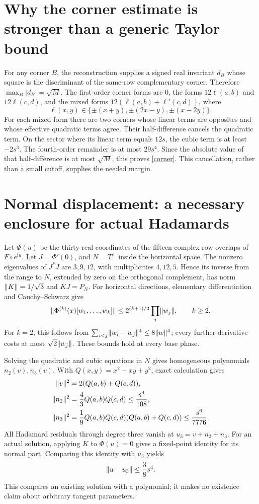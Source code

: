 \documentclass[11pt]{article}
\newcommand{\ii}{\mathrm i}\newcommand{\perm}{\operatorname{perm}}
\begin{document}
\section*{Why the corner estimate is stronger than a generic Taylor bound}
For any corner $B$, the reconstruction supplies a signed real invariant
$d_B$ whose square is the discriminant of the same-row complementary
corner. Therefore $\max_B|d_B|=\sqrt M$.
The first-order corner forms are $0$, the forms $12\ell(a,b)$ and
$12\ell(c,d)$, and the mixed forms $12(\ell(a,b)+\ell'(c,d))$, where
\[
 \ell(x,y)\in\{\pm(x+y),\pm(2x-y),\pm(x-2y)\}.
\]
For each mixed form there are two corners whose linear terms are opposites
and whose effective quadratic terms agree. Their half-difference cancels
the quadratic term. On the sector where its linear term equals $12s$,
the cubic term is at least $-2s^3$. The fourth-order remainder is at most
$29s^4$. Since the absolute value of that half-difference is at most
$\sqrt M$, this proves \eqref{corner}.
This cancellation, rather than a small cutoff, supplies the needed margin.

\section*{Normal displacement: a necessary enclosure for actual Hadamards}
Let $\Phi(u)$ be the thirty real coordinates of the fifteen complex
row overlaps of $F\circ e^{\ii u}$. Let $J=\Phi'(0)$, and $N=T^\perp$
inside the horizontal space. The nonzero eigenvalues of $J^*J$ are
$3,9,12$, with multiplicities $4,12,5$. Hence its inverse from the range
to $N$, extended by zero on the orthogonal complement, has norm
$\lVert K\rVert=1/\sqrt3$ and $KJ=P_N$.
For horizontal directions, elementary differentiation and Cauchy--Schwarz give
\[
 \lVert\Phi^{(k)}(x)[w_1,\ldots,w_k]\rVert
 \le 2^{(k+1)/2}\prod_j\lVert w_j\rVert,\qquad k\ge2.
\]
For $k=2$, this follows from
$\sum_{i<j}\lVert w_i-w_j\rVert^4\le8\lVert w\rVert^4$; every further derivative
costs at most $\sqrt2\lVert w_j\rVert$. These bounds hold at every base phase.

Solving the quadratic and cubic equations in $N$ gives homogeneous
polynomials $n_2(v),n_3(v)$. With $Q(x,y)=x^2-xy+y^2$, exact calculation gives
\begin{align*}
 \lVert v\rVert^2&=2(Q(a,b)+Q(c,d)),\\
 \lVert n_2\rVert^2&=\frac43Q(a,b)Q(c,d)\le\frac{s^4}{108},\\
 \lVert n_3\rVert^2&=\frac19Q(a,b)Q(c,d)(Q(a,b)+Q(c,d))\le\frac{s^6}{7776}.
\end{align*}
All Hadamard residuals through degree three vanish at $u_3=v+n_2+n_3$.
For an actual solution, applying $K$ to $\Phi(u)=0$ gives a fixed-point
identity for its normal part. Comparing this identity with $u_3$ yields
\begin{equation}
 \lVert u-u_3\rVert\le\frac38s^4.\label{normal}
\end{equation}
This compares an existing solution with a polynomial; it makes no existence
claim about arbitrary tangent parameters.
\end{document}
